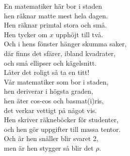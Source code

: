 \documentclass[a6paper, 10pt, twoside]{article}
\begin{document}
\noindent
\begin{center}
\end{center}
\begin{lyrics}
En matematiker här bor i staden \\
hen räknar matte mest hela dagen. \\
Hen räknar primtal stora och små. \\
Hen tycker om $x$ upphöjt till två. \\
Och i hens fönster hänger skumma saker, \\
där finns det sfärer, ibland kvadrater, \\
och små ellipser och kägelsnitt. \\
Låter det roligt så ta en titt! 
\vspace{5pt} \\
Vår matematiker som bor i staden, \\
hen deriverar i högsta graden, \\
hen äter cos-cos och basmat(i)ris, \\
det verkar vettigt på något vis. \\
Hen skriver räkneböcker för studenter, \\
och hen gör uppgifter till massa tentor. \\
Och är hen snäller blir svaret 2, \\
men är hen stygger så blir det $\rho$. 
\end{lyrics}
\end{document}
